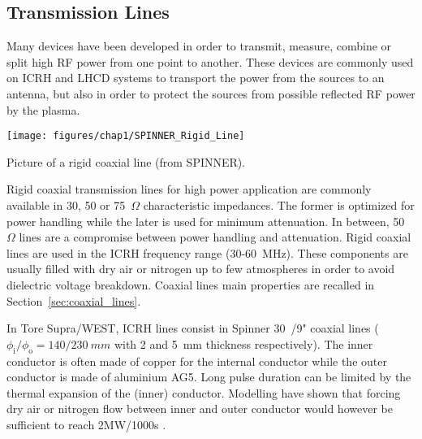 \subsection{Transmission Lines}
Many devices have been developed in order to transmit, measure, combine or split high RF power from one point to another. These devices are commonly used on ICRH and LHCD systems to transport the power from the sources to an antenna, but also in order to protect the sources from possible reflected RF power by the plasma.  


\begin{marginfigure}
	\centering
	\texttt{[image: figures/chap1/SPINNER\_Rigid\_Line]}
	\caption{Picture of a rigid coaxial line (from SPINNER).}
	\label{fig:spinnerrigidline}
\end{marginfigure}

Rigid coaxial transmission lines for high power application are commonly available in 30, 50 or 75~$\si{\Omega}$ characteristic impedances. The former is optimized for power handling while the later is used for minimum attenuation. In between, 50~$\si{\Omega}$ lines are a compromise between power handling and attenuation. Rigid coaxial lines are used in the ICRH frequency range (30-60~\si{MHz}). These components are usually filled with dry air or nitrogen up to few atmospheres in order to avoid dielectric voltage breakdown. Coaxial lines main properties are recalled in Section~\ref{sec:coaxial_lines}.

In Tore Supra/WEST, ICRH lines consist in Spinner 30~\si{\Omega}/9" coaxial lines ($\phi_\mathrm{i}/\phi_\mathrm{o}=140/230~\si{mm}$ with 2 and 5~\si{mm} thickness respectively). The inner conductor is often made of copper for the internal conductor while the outer conductor is made of aluminium AG5. Long pulse duration can be limited by the thermal expansion of the (inner) conductor. Modelling have shown that forcing dry air or nitrogen flow between inner and outer conductor would however be sufficient to reach 2\si{MW}/1000\si{s} .


